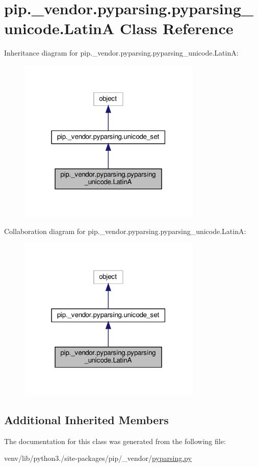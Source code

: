 \hypertarget{classpip_1_1__vendor_1_1pyparsing_1_1pyparsing__unicode_1_1LatinA}{}\section{pip.\+\_\+vendor.\+pyparsing.\+pyparsing\+\_\+unicode.\+LatinA Class Reference}
\label{classpip_1_1__vendor_1_1pyparsing_1_1pyparsing__unicode_1_1LatinA}


Inheritance diagram for pip.\+\_\+vendor.\+pyparsing.\+pyparsing\+\_\+unicode.\+LatinA\+:
\nopagebreak
\begin{figure}[H]
\begin{center}
\leavevmode
\includegraphics[width=247pt]{classpip_1_1__vendor_1_1pyparsing_1_1pyparsing__unicode_1_1LatinA__inherit__graph}
\end{center}
\end{figure}


Collaboration diagram for pip.\+\_\+vendor.\+pyparsing.\+pyparsing\+\_\+unicode.\+LatinA\+:
\nopagebreak
\begin{figure}[H]
\begin{center}
\leavevmode
\includegraphics[width=247pt]{classpip_1_1__vendor_1_1pyparsing_1_1pyparsing__unicode_1_1LatinA__coll__graph}
\end{center}
\end{figure}
\subsection*{Additional Inherited Members}


The documentation for this class was generated from the following file\+:\begin{DoxyCompactItemize}
\item 
venv/lib/python3./site-\/packages/pip/\+\_\+vendor/\hyperlink{pip_2__vendor_2pyparsing_8py}{pyparsing.\+py}\end{DoxyCompactItemize}
